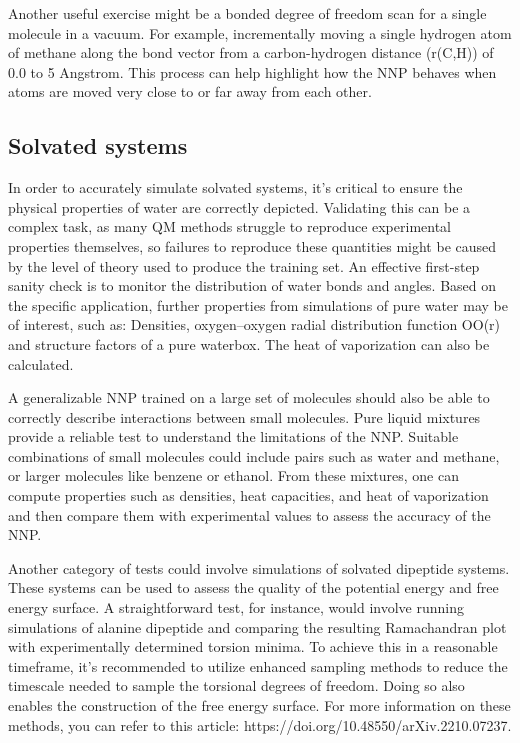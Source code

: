 \documentclass[9pt,bestpractices]{livecoms}
\begin{document}
Another useful exercise might be a bonded degree of freedom scan for a single molecule in a vacuum. For example, incrementally moving a single hydrogen atom of methane along the bond vector from a carbon-hydrogen distance (r(C,H)) of 0.0 to 5 Angstrom. This process can help highlight how the NNP behaves when atoms are moved very close to or far away from each other.

\subsection{Solvated systems}

In order to accurately simulate solvated systems, it's critical to ensure the physical properties of water are correctly depicted. Validating this can be a complex task, as many QM methods struggle to reproduce experimental properties themselves, so failures to reproduce these quantities might be caused by the level of theory used to produce the training set.
An effective first-step sanity check is to monitor the distribution of water bonds and angles.
Based on the specific application, further properties from simulations of pure water may be of interest, such as: Densities, oxygen–oxygen radial distribution function OO(r) and structure factors of a pure waterbox. The heat of vaporization can also be calculated.

A generalizable NNP trained on a large set of molecules should also be able to correctly describe interactions between small molecules. Pure liquid mixtures provide a reliable test to understand the limitations of the NNP. Suitable combinations of small molecules could include pairs such as water and methane, or larger molecules like benzene or ethanol. From these mixtures, one can compute properties such as densities, heat capacities, and heat of vaporization and then compare them with experimental values to assess the accuracy of the NNP.

Another category of tests could involve simulations of solvated dipeptide systems. These systems can be used to assess the quality of the potential energy and free energy surface. A straightforward test, for instance, would involve running simulations of alanine dipeptide and comparing the resulting Ramachandran plot with experimentally determined torsion minima. To achieve this in a reasonable timeframe, it's recommended to utilize enhanced sampling methods to reduce the timescale needed to sample the torsional degrees of freedom. Doing so also enables the construction of the free energy surface. For more information on these methods, you can refer to this article: https://doi.org/10.48550/arXiv.2210.07237.
\end{document}
